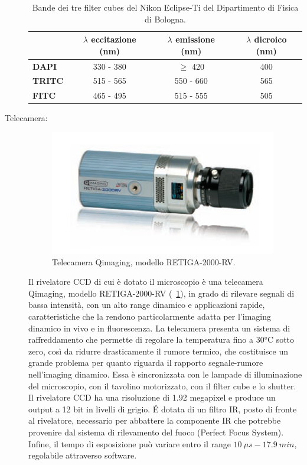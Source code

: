 \begin{description}
\begin{table}[!ht]
 \begin{center}
\begin{small}
\begin{tabular}{lccc}
\hline\hline
&\textbf{$\lambda$ eccitazione (nm)}&\textbf{$\lambda$ emissione (nm)}&\textbf{$\lambda$ dicroico (nm)}\\
\hline
\textbf{DAPI}&330 - 380&$\geq$ 420&400\\
\textbf{TRITC}&515 - 565&550 - 660&565\\
\textbf{FITC}&465 - 495&515 - 555&505\\
\hline\hline
\end{tabular}
\caption{\small{Bande dei tre filter cubes del Nikon Eclipse-Ti del Dipartimento di Fisica di Bologna.}}
\label{TAB}
\end{small}
\end{center}
\end{table}

\item[Telecamera:]

\begin{figure}
 \centering
 \includegraphics[scale=.40]{img/CAP2CCD.png}
 \caption{\small{Telecamera Qimaging, modello RETIGA-2000-RV.}}
 \label{fig:CCD}
\end{figure}

Il rivelatore CCD di cui è dotato il microscopio è una telecamera Qimaging, modello RETIGA-2000-RV (\figurename~\ref{fig:CCD}), in grado di rilevare segnali di bassa intensità, con un alto range dinamico e applicazioni rapide, caratteristiche che la rendono particolarmente adatta per l'imaging dinamico in vivo e in fluorescenza.
La telecamera presenta un sistema di raffreddamento che permette di regolare la temperatura fino a 30°C sotto zero, così da ridurre drasticamente il rumore termico, che costituisce un grande problema per quanto riguarda il rapporto segnale-rumore nell'imaging dinamico.
Essa è sincronizzata con le lampade di illuminazione del microscopio, con il tavolino motorizzato, con il filter cube e lo shutter. 
Il rivelatore CCD ha una risoluzione di 1.92 megapixel e produce un output a 12 bit in livelli di grigio.
\'E dotata di un filtro IR, posto di fronte al rivelatore, necessario per abbattere la componente IR che potrebbe provenire dal sistema di rilevamento del fuoco (Perfect Focus System). 
Infine, il tempo di esposizione può variare entro il range $10\ \mu s - 17.9\ min $, regolabile attraverso software.


\end{description}
